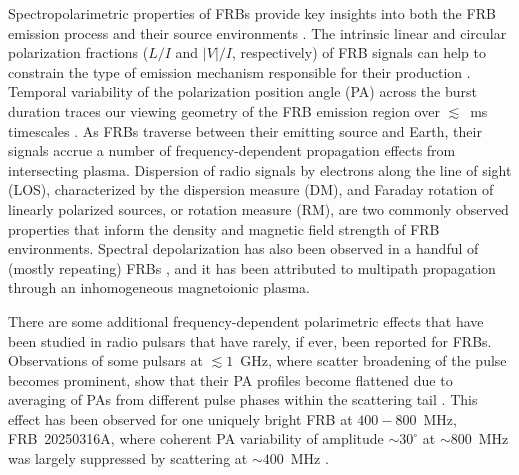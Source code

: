 \documentclass[twocolumn, linenumbers]{aastex701}
\begin{document}
Spectropolarimetric properties of FRBs provide key insights into both the FRB emission process and their source environments \citep[e.g.,][]{2024ApJ...968...50P, 2024ApJ...964..131S, Scott_2025_PASA}. The intrinsic linear and circular polarization fractions ($L/I$ and $|V|/I$, respectively) of FRB signals can help to constrain the type of emission mechanism responsible for their production \citep[e.g.,][]{2023MNRAS.522.2448Q}. Temporal variability of the polarization position angle (PA) across the burst duration traces our viewing geometry of the FRB emission region over $\lesssim$~ms timescales \citep[often parameterized as the ``rotating vector model'' or ``RVM'' that is applied to radio pulsar emission and to some FRBs, e.g.,][]{1969ApL.....3..225R, 2023MNRAS.520.4801J, 2025Natur.637...43M}. As FRBs traverse between their emitting source and Earth, their signals accrue a number of frequency-dependent propagation effects from intersecting plasma. Dispersion of radio signals by electrons along the line of sight (LOS), characterized by the dispersion measure (DM), and Faraday rotation of linearly polarized sources, or rotation measure (RM), are two commonly observed properties that inform the density and magnetic field strength of FRB environments. Spectral depolarization has also been observed in a handful of (mostly repeating) FRBs \citep{2022Sci...375.1266F, 2025MNRAS.tmp.1894U, 2024ApJ...968...50P, 2026ApJ..1000L..53P}, and it has been attributed to multipath propagation through an inhomogeneous magnetoionic plasma.

There are some additional frequency-dependent polarimetric effects that have been studied in radio pulsars that have rarely, if ever, been reported for FRBs. Observations of some pulsars at $\lesssim 1$~GHz, where scatter broadening of the pulse becomes prominent, show that their PA profiles become flattened due to averaging of PAs from different pulse phases within the scattering tail \citep[e.g.,][]{1972AuJPh..25..759K, 2003A&A...410..253L, 2009MNRAS.392L..60K, 2009MNRAS.396.1559N, 2023RAA....23j4002W}. This effect has been observed for one uniquely bright FRB at $400-800$~MHz, FRB~20250316A, where coherent PA variability of amplitude $\sim 30^\circ$ at $\sim 800$~MHz was largely suppressed by scattering at $\sim 400$~MHz \citep{2025ApJ...989L..48C}. 
\end{document}
